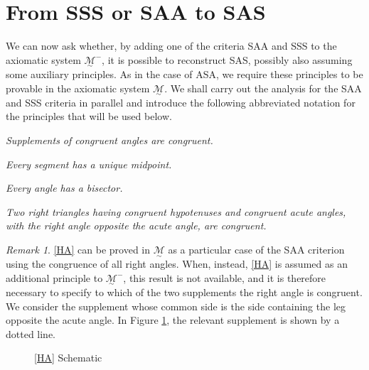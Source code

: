 \documentclass[11pt,a4paper]{article}
\theoremstyle{definition}
\theoremstyle{remark}
\newtheorem{rem}[thm]{Remark}
\numberwithin{equation}{section}
\newcommand{\MG}{\underset{\sim}{\mathcal{M}}} %
\newcommand{\pic}[1]{\textrm{Pic}\left(#1\right)}
\newcommand{\RightAngle}[5]{%
  \coordinate (RAa) at ($(#1)!#4!(#2)$);
  \coordinate (RAb) at ($(#1)!#5!(#3)$);
  \coordinate (RAc) at ($(RAa)+(RAb)-(#1)$);
  \draw (RAa)--(RAc)--(RAb);
}
\begin{document}
\section{From SSS or SAA to SAS}\label{PEN_s3}
We can now ask whether, by adding one of the criteria SAA and SSS to the axiomatic system $\MG^{-}$, it is possible to reconstruct SAS, possibly also assuming some auxiliary principles. As in the case of ASA, we require these principles to be provable in the axiomatic system $\MG$. We shall carry out the analysis for the SAA and SSS criteria in parallel and introduce the following abbreviated notation for the principles that will be used below.
\begin{enumerate}[label=\textrm{[}\textbf{SA}\textrm{]}]
  \item\label{SA} \emph{Supplements of congruent angles are congruent.}
\end{enumerate}
\begin{enumerate}[label=\textrm{[}\textbf{MS}\textrm{]}]
  \item\label{MS} \emph{Every segment has a unique midpoint.}
\end{enumerate}
\begin{enumerate}[label=\textrm{[}\textbf{AB}\textrm{]}]
  \item\label{AB} \emph{Every angle has a bisector.}
\end{enumerate}
\begin{enumerate}[label=\textrm{[}\textbf{HA}\textrm{]}]
  \item\label{HA} \emph{Two right triangles having congruent hypotenuses and congruent acute angles, with the right angle opposite the acute angle, are congruent.}
\end{enumerate}
\begin{rem}\label{PEN_REM_HA}
\ref{HA} can be proved in $\MG$ as a particular case of the SAA criterion using the congruence of all right angles. When, instead, \ref{HA} is assumed as an additional principle to $\MG^{-}$, this result is not available, and it is therefore necessary to specify to which of the two supplements the right angle is congruent. We consider the supplement whose common side is the side containing the leg opposite the acute angle. In Figure \ref{PEN_REM_HA_f}, the relevant supplement is shown by a dotted line.
\begin{figure}[ht!]
\centering
{}
\caption{\ref{HA} Schematic}\label{PEN_REM_HA_f}
\end{figure}
\end{rem}
\end{document}
